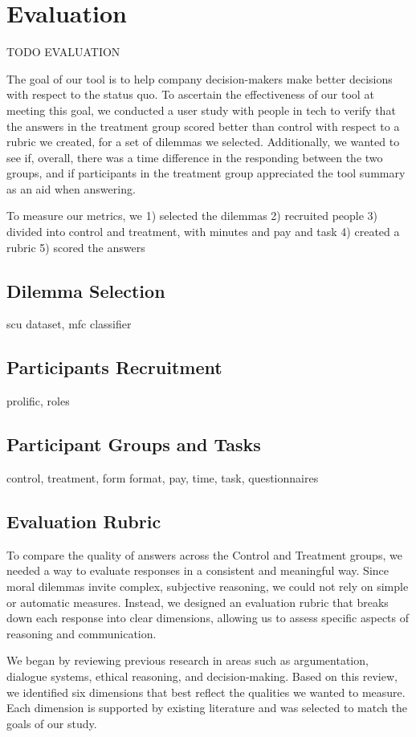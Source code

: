 \documentclass[sigconf, authorversion, nonacm, screen]{acmart}
\begin{document}
\section{Evaluation}

TODO EVALUATION

The goal of our tool is to help company decision-makers make better decisions with respect to the status quo.
To ascertain the effectiveness of our tool at meeting this goal, we conducted a user study with people in tech to verify that the answers in the treatment group scored better than control with respect to a rubric we created, for a set of dilemmas we selected.
Additionally, we wanted to see if, overall, there was a time difference in the responding between the two groups, and if participants in the treatment group appreciated the tool summary as an aid when answering.

To measure our metrics, we 
1) selected the dilemmas
2) recruited people
3) divided into control and treatment, with minutes and pay and task
4) created a rubric 
5) scored the answers

\subsection{Dilemma Selection}
scu dataset, mfc classifier
\subsection{Participants Recruitment}
prolific, roles
\subsection{Participant Groups and Tasks}
control, treatment, form format, pay, time, task, questionnaires
\subsection{Evaluation Rubric}
To compare the quality of answers across the Control and Treatment groups, we needed a way to evaluate responses in a consistent and meaningful way. Since moral dilemmas invite complex, subjective reasoning, we could not rely on simple or automatic measures. Instead, we designed an evaluation rubric that breaks down each response into clear dimensions, allowing us to assess specific aspects of reasoning and communication.

We began by reviewing previous research in areas such as argumentation, dialogue systems, ethical reasoning, and decision-making. Based on this review, we identified six dimensions that best reflect the qualities we wanted to measure. Each dimension is supported by existing literature and was selected to match the goals of our study.
\end{document}
